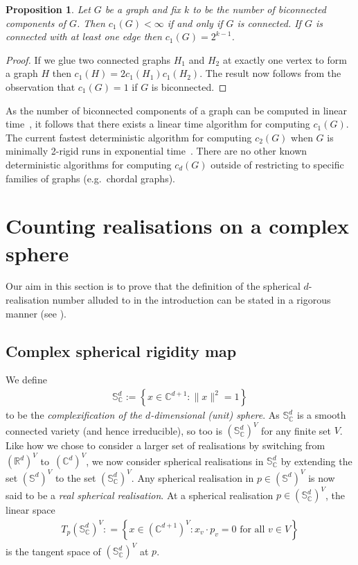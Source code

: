 \documentclass[11pt]{article}
\newtheorem{proposition}[theo]{Proposition}
\theoremstyle{definition}
\providecommand{\eg}{e.g.\ }
\numberwithin{equation}{section}
\begin{document}
\begin{proposition}\label{p:1d}
	Let $G$ be a graph and fix $k$ to be the number of biconnected components of $G$.
	Then $c_1(G) < \infty$ if and only if $G$ is connected.
	If $G$ is connected with at least one edge then $c_1(G) = 2^{k-1}$.
\end{proposition}

\begin{proof}
	If we glue two connected graphs $H_1$ and $H_2$ at exactly one vertex to form a graph $H$ then $c_1(H) = 2c_1(H_1)c_1(H_2)$.
	The result now follows from the observation that $c_1(G) = 1$ if $G$ is biconnected.
\end{proof}

As the number of biconnected components of a graph can be computed in linear time~\cite{HopcroftTarjan}, it follows that there exists a linear time algorithm for computing $c_1(G)$.
The current fastest deterministic algorithm for computing $c_2(G)$ when $G$ is minimally 2-rigid runs in exponential time~\cite{PlaneCount}.
There are no other known deterministic algorithms for computing $c_d(G)$ outside of restricting to specific families of graphs (\eg chordal graphs).




\section{Counting realisations on a complex sphere}\label{sec:countsphere}

Our aim in this section is to prove that the definition of the spherical $d$-realisation number alluded to in the introduction can be stated in a rigorous manner (see ).

\subsection{Complex spherical rigidity map}

We define
\begin{align*}
	\mathbb{S}_{\mathbb{C}}^d := \left\{ x \in \mathbb{C}^{d+1} : \|x\|^2=1 \right\}
\end{align*}
to be the \emph{complexification of the $d$-dimensional (unit) sphere}.
As $\mathbb{S}_{\mathbb{C}}^d$ is a smooth connected variety (and hence irreducible),
so too is $(\mathbb{S}_{\mathbb{C}}^{d})^V$ for any finite set $V$.
Like how we chose to consider a larger set of realisations by switching from $(\mathbb{R}^d)^V$ to~$(\mathbb{C}^d)^V$,
we now consider spherical realisations in $\mathbb{S}_\mathbb{C}^d$ by extending the set $(\mathbb{S}^d)^V$ to the set $(\mathbb{S}_{\mathbb{C}}^d)^V$.
Any spherical realisation in $p \in (\mathbb{S}^d)^V$ is now said to be a \emph{real spherical realisation}.
At a spherical realisation $p \in (\mathbb{S}_{\mathbb{C}}^{d})^{V}$,
the linear space
\begin{align*}
	T_p (\mathbb{S}_{\mathbb{C}}^d)^V : =\left\{x \in (\mathbb{C}^{d+1})^V : x_v \cdot p_v=0 \text{ for all } v \in V \right\}
\end{align*}
is the tangent space of $(\mathbb{S}_{\mathbb{C}}^{d})^{V}$ at $p$.
\end{document}
